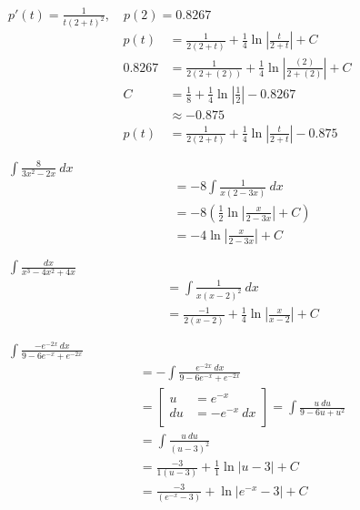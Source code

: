 \documentclass[12pt]{article}
\newenvironment{problem}[2][]{
    \begin{trivlist}
        \item[
            {\bfseries #1}
            {\bfseries #2.}
        ]
}{\end{trivlist}}
\newcommand{\subu}[2]{
\left[
\begin{alignedat}{1}
u &= #1 \\
du &= #2 \\
\end{alignedat}
\right] 
}
\begin{document}
\begin{problem}{32}
$p'(t) = \frac{1}{t(2 + t)^2}, \quad p(2) = 0.8267$
\begin{align}
p(t) &= \frac{1}{2(2 + t)} + \frac{1}{4} \ln\left|\frac{t}{2 + t}\right| + C \\
0.8267 &= \frac{1}{2(2 + (2))} + \frac{1}{4} \ln\left|\frac{(2)}{2 + (2)}\right| + C \\
C &= \frac{1}{8} + \frac{1}{4} \ln\left|\frac{1}{2}\right| - 0.8267 \\
&\approx -0.875 \\
p(t) &= \frac{1}{2(2 + t)} + \frac{1}{4} \ln\left|\frac{t}{2 + t}\right| - 0.875
\end{align}
\end{problem}

\begin{problem}{33}
$\displaystyle\int \frac{8}{3x^2 - 2x} ~ dx$
\begin{align}
&= -8 \int \frac{1}{x(2 - 3x)} ~ dx \\
&= -8 \left(\frac{1}{2} \ln\left|\frac{x}{2 - 3x}\right| + C\right) \\
&= -4 \ln\left|\frac{x}{2 - 3x}\right| + C
\end{align}
\end{problem}

\begin{problem}{35}
$\displaystyle\int \frac{dx}{x^3 - 4x^2 + 4x}$
\begin{align}
&= \int \frac{1}{x(x - 2)^2} ~ dx \\
&= \frac{-1}{2(x - 2)} + \frac{1}{4} \ln\left|\frac{x}{x - 2}\right| + C
\end{align}
\end{problem}

\begin{problem}{37}
$\displaystyle\int \frac{-e^{-2x} ~ dx}{9 - 6e^{-x} + e^{-2x}}$
\begin{align}
&= - \int \frac{e^{-2x} ~ dx}{9 - 6e^{-x} + e^{-2x}} \\
&= \subu{e^{-x}}{-e^{-x} ~ dx} = \int \frac{u ~ du}{9 - 6u + u^2} \\
&= \int \frac{u ~ du}{(u - 3)^2} \\
&= \frac{-3}{1(u - 3)} + \frac{1}{1} \ln\left|u - 3\right| + C \\
&= \frac{-3}{(e^{-x} - 3)} + \ln\left|e^{-x} - 3\right| + C
\end{align}
\end{problem}
\end{document}

